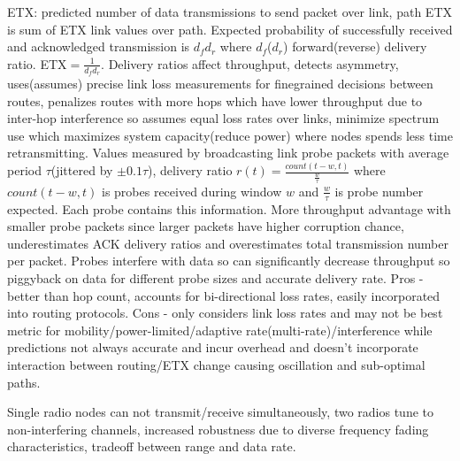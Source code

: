 \documentclass[8pt]{extarticle}
\begin{document}
\begin{multicols}{2}
ETX: predicted number of data transmissions to send packet over link, path ETX is sum of ETX link values over path. Expected probability of successfully received and acknowledged transmission is $d_fd_r$ where $d_f$($d_r$) forward(reverse) delivery ratio. ETX$=\frac{1}{d_fd_r}$. Delivery ratios affect throughput, detects asymmetry, uses(assumes) precise link loss measurements for finegrained decisions between routes, penalizes routes with more hops which have lower throughput due to inter-hop interference so assumes equal loss rates over links, minimize spectrum use which maximizes system capacity(reduce power) where nodes spends less time retransmitting. Values measured by broadcasting link probe packets with average period $\tau$(jittered by $±0.1\tau$), delivery ratio $r(t)=\frac{count(t-w,t)}{\frac{w}{\tau}}$ where $count(t-w,t)$ is probes received during window $w$ and $\frac{w}{\tau}$ is probe number expected. Each probe contains this information. More throughput advantage with smaller probe packets since larger packets have higher corruption chance, underestimates ACK delivery ratios and overestimates total transmission number per packet. Probes interfere with data so can significantly decrease throughput so piggyback on data for different probe sizes and accurate delivery rate. Pros - better than hop count, accounts for bi-directional loss rates, easily incorporated into routing protocols. Cons - only considers link loss rates and may not be best metric for mobility/power-limited/adaptive rate(multi-rate)/interference while predictions not always accurate and incur overhead and doesn't incorporate interaction between routing/ETX change causing oscillation and sub-optimal paths. 

Single radio nodes can not transmit/receive simultaneously, two radios tune to non-interfering channels, increased robustness due to diverse frequency fading characteristics, tradeoff between range and
data rate.


\end{multicols}
\end{document}
